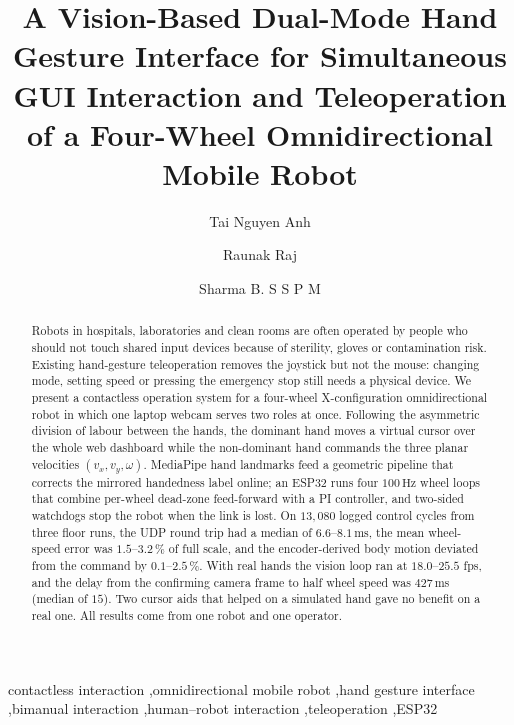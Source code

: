 \documentclass[5p,twocolumn]{elsarticle}
\begin{document}
\begin{frontmatter}

\title{A Vision-Based Dual-Mode Hand Gesture Interface for Simultaneous GUI Interaction and Teleoperation of a Four-Wheel Omnidirectional Mobile Robot}

\author[a]{Tai Nguyen Anh}
\author[b]{Raunak Raj}
\author[c]{Sharma B. S S P M}


\begin{abstract}
Robots in hospitals, laboratories and clean rooms are often operated by people who should not touch shared input devices because of sterility, gloves or contamination risk. Existing hand-gesture teleoperation removes the joystick but not the mouse: changing mode, setting speed or pressing the emergency stop still needs a physical device. We present a contactless operation system for a four-wheel X-configuration omnidirectional robot in which one laptop webcam serves two roles at once. Following the asymmetric division of labour between the hands, the dominant hand moves a virtual cursor over the whole web dashboard while the non-dominant hand commands the three planar velocities $(v_x, v_y, \omega)$. MediaPipe hand landmarks feed a geometric pipeline that corrects the mirrored handedness label online; an ESP32 runs four $100\,\mathrm{Hz}$ wheel loops that combine per-wheel dead-zone feed-forward with a PI controller, and two-sided watchdogs stop the robot when the link is lost. On $13{,}080$ logged control cycles from three floor runs, the UDP round trip had a median of $6.6$--$8.1\,\mathrm{ms}$, the mean wheel-speed error was $1.5$--$3.2\,\%$ of full scale, and the encoder-derived body motion deviated from the command by $0.1$--$2.5\,\%$. With real hands the vision loop ran at $18.0$--$25.5$ fps, and the delay from the confirming camera frame to half wheel speed was $427$\,ms (median of $15$). Two cursor aids that helped on a simulated hand gave no benefit on a real one. All results come from one robot and one operator.
\end{abstract}

\begin{keyword}
contactless interaction \sep omnidirectional mobile robot \sep hand gesture interface \sep bimanual interaction \sep human--robot interaction \sep teleoperation \sep ESP32
\end{keyword}

\end{frontmatter}
\end{document}
